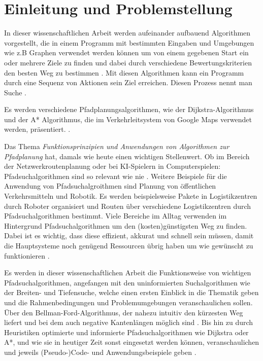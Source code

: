 
\chapter{Einleitung und Problemstellung}
\label{Einleitung und Problemstellung}


In dieser wissenschaftlichen Arbeit werden aufeinander aufbauend Algorithmen vorgestellt, die in einem Programm mit bestimmten Eingaben und Umgebungen 
wie z.B Graphen verwendet werden können um von einem gegebenen Start ein oder mehrere Ziele zu finden und dabei durch verschiedene Bewertungskriterien den besten Weg zu bestimmen \cite{Esri:00}.
Mit diesen Algorithmen kann ein Programm durch eine Sequenz von Aktionen sein Ziel erreichen. Diesen Prozess nennt man Suche \cite[150-156]{Russell:10}.

Es werden verschiedene Pfadplanungsalgorithmen, wie der Dijkstra-Algorithmus und der A* Algorithmus, 
die im Verkehrleitsystem von Google Maps verwendet werden, präsentiert. \cite{Mehta:19}. 

Das Thema \emph{Funktionsprinzipien und Anwendungen von Algorithmen zur Pfadplanung} hat, damals wie heute einen wichtigen Stellenwert. 
Ob im Bereich der Netzwerkroutenplanung oder bei KI-Spielern in Computerspielen: Pfadsuchalgorithmen sind so relevant wie nie \cite{Foeada:21}. 
Weitere Beispiele für die Anwendung von Pfadsuchalgroithmen sind Planung von öffentlichen Verkehrsmitteln und 
Robotik. Es werden beispielsweise Pakete in Logistikzentren durch Roboter organisiert und Routen über verschiedene Logistikzentren durch Pfadsuchalgorithmen bestimmt.
Viele Bereiche im Alltag verwenden im Hintergrund Pfadsuchalgorithmen um den (kosten)günstigsten Weg zu finden. Dabei ist es wichtig, 
dass diese effizient, akkurat und schnell sein müssen, damit die Hauptsysteme noch genügend Ressourcen übrig haben um wie gewünscht zu funktionieren \cite{Foeada:21}. 

Es werden in dieser wissenschaftlichen Arbeit die Funktionsweise von wichtigen Pfadsuchalgorithmen, angefangen mit den uninformierten Suchalgorithmen wie der Breiten- und Tiefensuche, 
welche einen ersten Einblick in die Thematik geben und die Rahmenbedingungen und Problemumgebungen veranschaulichen sollen. 
Über den Bellman-Ford-Algorithmus, der nahezu intuitiv den kürzesten Weg liefert und bei dem auch negative Kantenlängen möglich sind \cite{Mukhlif:20}. 
Bis hin zu durch Heuristiken optimierte und informierte Pfadsuchalgorithmen wie Dijkstra oder A*, und wie sie in heutiger Zeit 
sonst eingesetzt werden können, veranschaulichen und jeweils (Pseudo-)Code- und Anwendungsbeispiele geben \cite[64]{Russell:10}.
